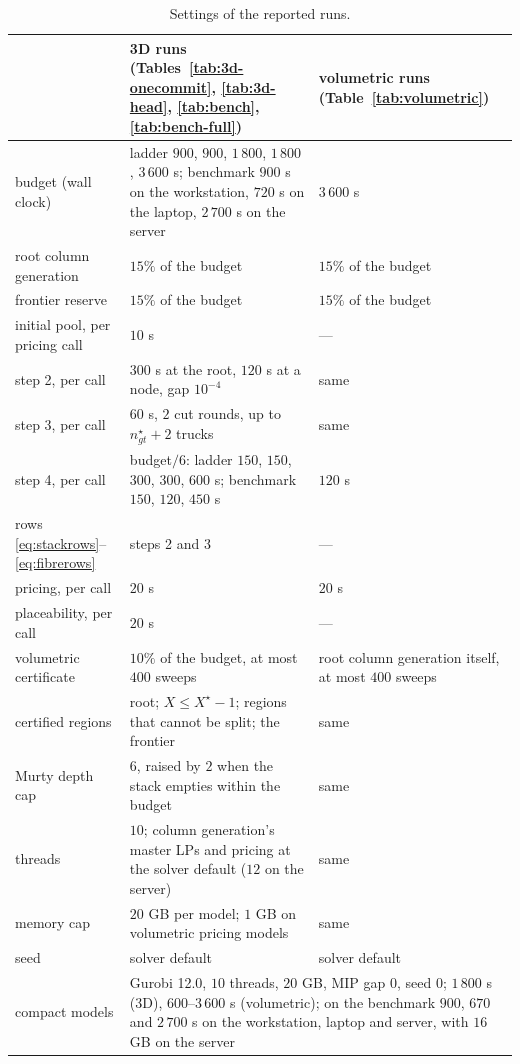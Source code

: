 \begin{table}[!t]
\centering
\small
\caption{Settings of the reported runs.}
\label{tab:impl}
\label{tab:protocol}
\begin{tabular}{@{}p{}p{}p{}@{}}
\toprule
 & 3D runs (Tables~\ref{tab:3d-onecommit}, \ref{tab:3d-head}, \ref{tab:bench}, \ref{tab:bench-full}) & volumetric runs (Table~\ref{tab:volumetric}) \\
\midrule
budget (wall clock) & ladder $900$, $900$, $1\,800$, $1\,800$, $3\,600$ s; benchmark $900$ s on the workstation, $720$ s on the laptop, $2\,700$ s on the server & $3\,600$ s \\
root column generation & $15\%$ of the budget & $15\%$ of the budget \\
frontier reserve & $15\%$ of the budget & $15\%$ of the budget \\
initial pool, per pricing call & $10$ s & --- \\
step 2, per call & $300$ s at the root, $120$ s at a node, gap $10^{-4}$ & same \\
step 3, per call & $60$ s, $2$ cut rounds, up to $n^{\star}_{gt}+2$ trucks & same \\
step 4, per call & budget$/6$: ladder $150$, $150$, $300$, $300$, $600$ s; benchmark $150$, $120$, $450$ s & $120$ s \\
rows \eqref{eq:stackrows}--\eqref{eq:fibrerows} & steps 2 and 3 & --- \\
pricing, per call & $20$ s & $20$ s \\
placeability, per call & $20$ s & --- \\
volumetric certificate & $10\%$ of the budget, at most $400$ sweeps & root column generation itself, at most $400$ sweeps \\
certified regions & root; $X\le X^{\star}-1$; regions that cannot be split; the frontier & same \\
Murty depth cap & $6$, raised by $2$ when the stack empties within the budget & same \\
threads & $10$; column generation's master LPs and pricing at the solver default ($12$ on the server) & same \\
memory cap & $20$ GB per model; $1$ GB on volumetric pricing models & same \\
seed & solver default & solver default \\
\midrule
compact models & \multicolumn{2}{p{0.67\textwidth}}{Gurobi 12.0, $10$ threads, $20$ GB, MIP gap $0$, seed $0$; $1\,800$ s (3D), $600$--$3\,600$ s (volumetric); on the benchmark $900$, $670$ and $2\,700$ s on the workstation, laptop and server, with $16$ GB on the server} \\

\end{tabular}
\end{table}
